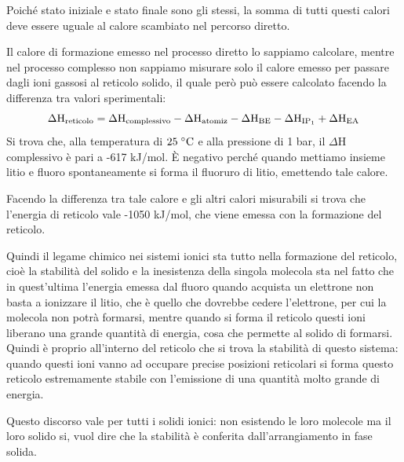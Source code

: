 \vspace{-0.2cm}Poiché stato iniziale e stato finale sono gli stessi, la somma di tutti questi calori deve essere uguale al calore scambiato nel percorso diretto.

Il calore di formazione emesso nel processo diretto lo sappiamo calcolare, mentre nel processo complesso non sappiamo misurare solo il calore emesso per passare dagli ioni gassosi al reticolo solido, il quale però può essere calcolato facendo la differenza tra valori sperimentali:
$$\Delta\rm{H}_{reticolo}=\Delta{H}_{complessivo} - \Delta{H}_{atomiz} - \Delta{H}_{BE} - \Delta{H}_{IP_1} + \Delta{H}_{EA}$$
Si trova che, alla temperatura di $25 \; ^{\circ} \rm C$ e alla pressione di 1 bar, il $\Delta$H complessivo è pari a -617 kJ/mol. È negativo perché quando mettiamo insieme litio e fluoro spontaneamente si forma il fluoruro di litio, emettendo tale calore.

Facendo la differenza tra tale calore e gli altri calori misurabili si trova che l'energia di reticolo vale -1050 kJ/mol, che viene emessa con la formazione del reticolo.

Quindi il legame chimico nei sistemi ionici sta tutto nella formazione del reticolo, cioè la stabilità del solido e la inesistenza della singola molecola sta nel fatto che in quest'ultima l'energia emessa dal fluoro quando acquista un elettrone non basta a ionizzare il litio, che è quello che dovrebbe cedere l'elettrone, per cui la molecola non potrà formarsi, mentre quando si forma il reticolo questi ioni liberano una grande quantità di energia, cosa che permette al solido di formarsi. Quindi è proprio all'interno del reticolo che si trova la stabilità di questo sistema: quando questi ioni vanno ad occupare precise posizioni reticolari si forma questo reticolo estremamente stabile con l'emissione di una quantità molto grande di energia.

Questo discorso vale per tutti i solidi ionici: non esistendo le loro molecole ma il loro solido si, vuol dire che la stabilità è conferita dall'arrangiamento in fase solida.

